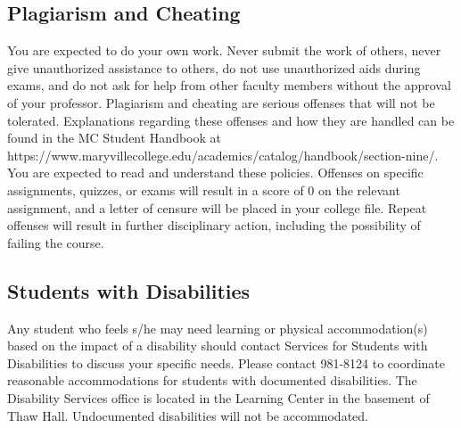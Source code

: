 \documentclass[11pt]{article}
\begin{document}
\subsection*{Plagiarism and Cheating}
You are expected to do your own work. Never submit the work of others,
never give unauthorized assistance to others, do not use unauthorized
aids during exams, and do not ask for help from other
faculty members without the approval of your professor. Plagiarism and cheating are serious offenses that will not be
tolerated. Explanations regarding these offenses and how they are handled can be found in the MC Student Handbook at\newline
https://www.maryvillecollege.edu/academics/catalog/handbook/section-nine/.\newline
You are expected to read and understand these policies. Offenses on specific assignments, quizzes, or exams will result
in a score of 0 on the relevant assignment, and a letter of censure will be placed in your college file. Repeat offenses will
result in further disciplinary action, including the possibility of failing the course.

\subsection*{Students with Disabilities}
Any student who feels s/he may need learning or physical
accommodation(s) based on the impact of a disability should contact Services for Students with Disabilities to discuss your
specific needs. Please contact 981-8124 to coordinate reasonable accommodations for students with documented
disabilities. The Disability Services office is located in the Learning Center in the basement of Thaw Hall. Undocumented
disabilities will not be accommodated.
\end{document}
